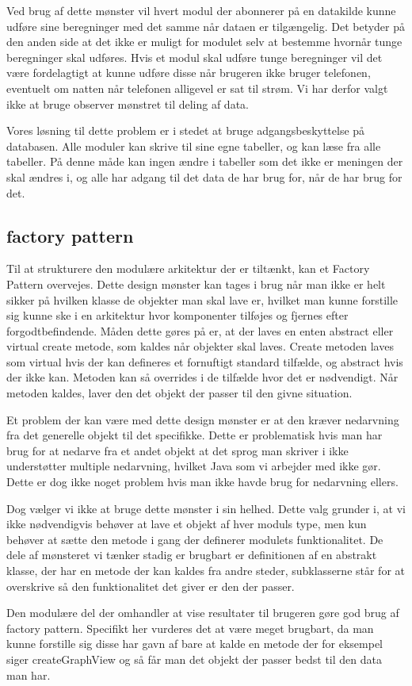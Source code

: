 Ved brug af dette mønster vil hvert modul der abonnerer på en datakilde kunne udføre sine beregninger med det samme når dataen er tilgængelig.
Det betyder på den anden side at det ikke er muligt for modulet selv at bestemme hvornår tunge beregninger skal udføres.
Hvis et modul skal udføre tunge beregninger vil det være fordelagtigt at kunne udføre disse når brugeren ikke bruger telefonen, eventuelt om natten når telefonen alligevel er sat til strøm.
Vi har derfor valgt ikke at bruge observer mønstret til deling af data.




Vores løsning til dette problem er i stedet at bruge adgangsbeskyttelse på databasen.
Alle moduler kan skrive til sine egne tabeller, og kan læse fra alle tabeller.
På denne måde kan ingen ændre i tabeller som det ikke er meningen der skal ændres i, og alle har adgang til det data de har brug for, når de har brug for det.



\subsection{factory pattern}
Til at strukturere den modulære arkitektur der er tiltænkt, kan et Factory Pattern overvejes.
Dette design mønster kan tages i brug når man ikke er helt sikker på hvilken klasse de objekter man skal lave er, hvilket man kunne forstille sig kunne ske i en arkitektur hvor komponenter tilføjes og fjernes efter forgodtbefindende.
Måden dette gøres på er, at der laves en enten abstract eller virtual create metode, som kaldes når objekter skal laves.
Create metoden laves som virtual hvis der kan defineres et fornuftigt standard tilfælde, og abstract hvis der ikke kan.
Metoden kan så overrides i de tilfælde hvor det er nødvendigt.
Når metoden kaldes, laver den det objekt der passer til den givne situation.

Et problem der kan være med dette design mønster er at den kræver nedarvning fra det generelle objekt til det specifikke.
Dette er problematisk hvis man har brug for at nedarve fra et andet objekt at det sprog man skriver i ikke understøtter multiple nedarvning, hvilket Java som vi arbejder med ikke gør.
Dette er dog ikke noget problem hvis man ikke havde brug for nedarvning ellers.

Dog vælger vi ikke at bruge dette mønster i sin helhed.
Dette valg grunder i, at vi ikke nødvendigvis behøver at lave et objekt af hver moduls type, men kun behøver at sætte den metode i gang der definerer modulets funktionalitet.
De dele af mønsteret vi tænker stadig er brugbart er definitionen af en abstrakt klasse, der har en metode der kan kaldes fra andre steder, subklasserne står for at overskrive så den funktionalitet det giver er den der passer.

Den modulære del der omhandler at vise resultater til brugeren gøre god brug af factory pattern.
Specifikt her vurderes det at være meget brugbart, da man kunne forstille sig disse har gavn af bare at kalde en metode der for eksempel siger createGraphView og så får man det objekt der passer bedst til den data man har.
